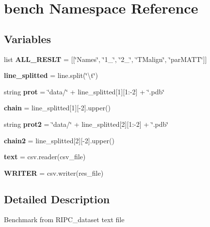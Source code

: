 \hypertarget{namespacebench}{}\section{bench Namespace Reference}
\label{namespacebench}
\subsection*{Variables}
\begin{DoxyCompactItemize}
\item 
\mbox{\label{namespacebench_a4327d3ff3e090c70b80ba0bcff97acd5}} 
list {\bfseries A\+L\+L\+\_\+\+R\+E\+S\+LT} = \mbox{[}\mbox{[}\char`\"{}Names\char`\"{}, \char`\"{}1\+\_\char`\"{}, \char`\"{}2\+\_\char`\"{}, \char`\"{}\+T\+Malign\char`\"{}, \char`\"{}par\+M\+A\+T\+T\char`\"{}\mbox{]}\mbox{]}
\item 
\mbox{\label{namespacebench_afe403fcee463706338822425225dc35d}} 
{\bfseries line\+\_\+splitted} = line.\+split(\char`\"{}\textbackslash{}t\char`\"{})
\item 
\mbox{\label{namespacebench_a82b8ff8d802febb2aed4ca01b820b6c0}} 
string {\bfseries prot} = \char`\"{}data/\char`\"{} + line\+\_\+splitted\mbox{[}1\mbox{]}\mbox{[}1\+:-\/2\mbox{]} + \char`\"{}.pdb\char`\"{}
\item 
\mbox{\label{namespacebench_a94859160adcad4d4eeb7ca1dff1ad69e}} 
{\bfseries chain} = line\+\_\+splitted\mbox{[}1\mbox{]}\mbox{[}-\/2\mbox{]}.upper()
\item 
\mbox{\label{namespacebench_aef156da92766cbcba2a8aab8c655522c}} 
string {\bfseries prot2} = \char`\"{}data/\char`\"{} + line\+\_\+splitted\mbox{[}2\mbox{]}\mbox{[}1\+:-\/2\mbox{]} + \char`\"{}.pdb\char`\"{}
\item 
\mbox{\label{namespacebench_afd82647a514491d0c43eb5f7e1c5ad00}} 
{\bfseries chain2} = line\+\_\+splitted\mbox{[}2\mbox{]}\mbox{[}-\/2\mbox{]}.upper()
\item 
\mbox{\label{namespacebench_a179c2ab5bc59192bd809797f68cea79c}} 
{\bfseries text} = csv.\+reader(csv\+\_\+file)
\item 
\mbox{\label{namespacebench_acbc74e827a680e4465fbb1ec0b5e6fab}} 
{\bfseries W\+R\+I\+T\+ER} = csv.\+writer(res\+\_\+file)
\end{DoxyCompactItemize}


\subsection{Detailed Description}
\begin{DoxyVerb}Benchmark from RIPC_dataset text file
\end{DoxyVerb}
 